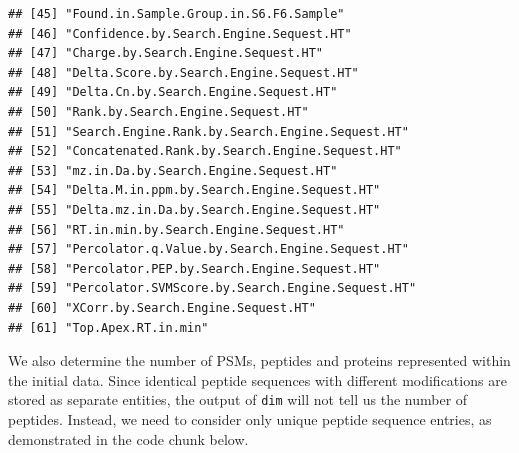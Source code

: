 \documentclass[9pt,a4paper,]{extarticle}
\begin{document}
\begin{verbatim}
## [45] "Found.in.Sample.Group.in.S6.F6.Sample"          
## [46] "Confidence.by.Search.Engine.Sequest.HT"         
## [47] "Charge.by.Search.Engine.Sequest.HT"             
## [48] "Delta.Score.by.Search.Engine.Sequest.HT"        
## [49] "Delta.Cn.by.Search.Engine.Sequest.HT"           
## [50] "Rank.by.Search.Engine.Sequest.HT"               
## [51] "Search.Engine.Rank.by.Search.Engine.Sequest.HT" 
## [52] "Concatenated.Rank.by.Search.Engine.Sequest.HT"  
## [53] "mz.in.Da.by.Search.Engine.Sequest.HT"           
## [54] "Delta.M.in.ppm.by.Search.Engine.Sequest.HT"     
## [55] "Delta.mz.in.Da.by.Search.Engine.Sequest.HT"     
## [56] "RT.in.min.by.Search.Engine.Sequest.HT"          
## [57] "Percolator.q.Value.by.Search.Engine.Sequest.HT" 
## [58] "Percolator.PEP.by.Search.Engine.Sequest.HT"     
## [59] "Percolator.SVMScore.by.Search.Engine.Sequest.HT"
## [60] "XCorr.by.Search.Engine.Sequest.HT"              
## [61] "Top.Apex.RT.in.min"
\end{verbatim}

We also determine the number of PSMs, peptides and proteins represented within
the initial data. Since identical peptide sequences with different modifications
are stored as separate entities, the output of \texttt{dim} will not tell us the number
of peptides. Instead, we need to consider only unique peptide sequence entries,
as demonstrated in the code chunk below.
\end{document}
